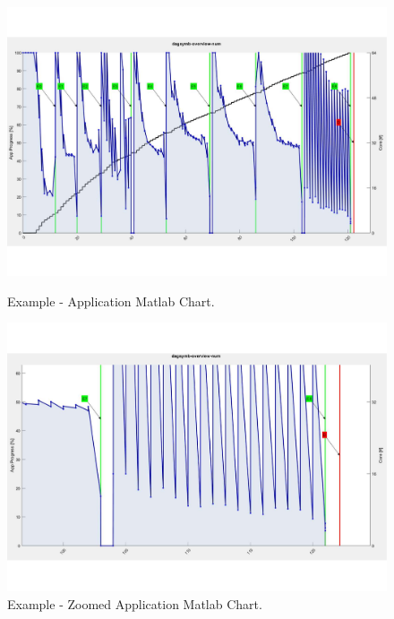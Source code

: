 \begin{figure}[t]
\begin{minipage}{0.5\columnwidth}
	\includegraphics[width=\columnwidth]{images/plot_app.pdf}
	\caption{Example - Application Matlab Chart.}
	\label{fig:plot_app}
\end{minipage}
\begin{minipage}{0.5\columnwidth}
	\includegraphics[width=\columnwidth]{images/plot_app_zoom.pdf}
	\caption{Example - Zoomed Application Matlab Chart.}
	\label{fig:plot_app_zoom}
\end{minipage}

\end{figure}
